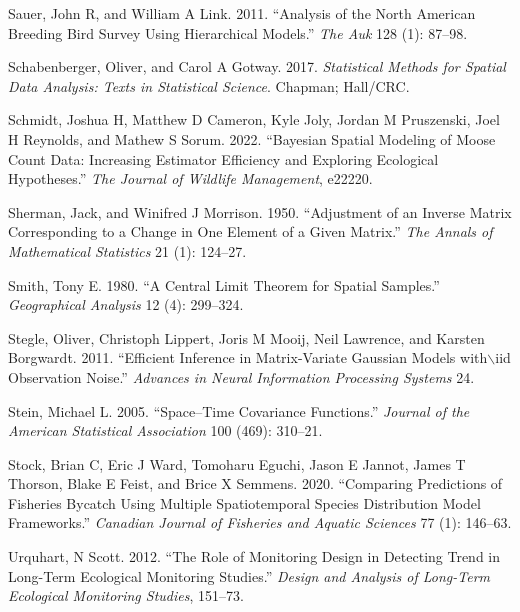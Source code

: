 \documentclass[smallextended]{svjour3}       %
\newlength{\cslhangindent}
\newlength{\cslentryspacingunit} %
\newenvironment{CSLReferences}[2] %
 {%
  \setlength{\parindent}{0pt}
  \ifodd #1
  \let\oldpar\par
  \def\par{\hangindent=\cslhangindent\oldpar}
  \fi
  \setlength{\parskip}{#2\cslentryspacingunit}
 }%
 {}
\begin{document}
\begin{CSLReferences}{1}{0}
\leavevmode{}%
Sauer, John R, and William A Link. 2011. {``Analysis of the North
American Breeding Bird Survey Using Hierarchical Models.''} \emph{The
Auk} 128 (1): 87--98.

\leavevmode{}%
Schabenberger, Oliver, and Carol A Gotway. 2017. \emph{Statistical
Methods for Spatial Data Analysis: Texts in Statistical Science}.
Chapman; Hall/CRC.

\leavevmode{}%
Schmidt, Joshua H, Matthew D Cameron, Kyle Joly, Jordan M Pruszenski,
Joel H Reynolds, and Mathew S Sorum. 2022. {``Bayesian Spatial Modeling
of Moose Count Data: Increasing Estimator Efficiency and Exploring
Ecological Hypotheses.''} \emph{The Journal of Wildlife Management},
e22220.

\leavevmode{}%
Sherman, Jack, and Winifred J Morrison. 1950. {``Adjustment of an
Inverse Matrix Corresponding to a Change in One Element of a Given
Matrix.''} \emph{The Annals of Mathematical Statistics} 21 (1): 124--27.

\leavevmode{}%
Smith, Tony E. 1980. {``A Central Limit Theorem for Spatial Samples.''}
\emph{Geographical Analysis} 12 (4): 299--324.

\leavevmode{}%
Stegle, Oliver, Christoph Lippert, Joris M Mooij, Neil Lawrence, and
Karsten Borgwardt. 2011. {``Efficient Inference in Matrix-Variate
Gaussian Models with\(\backslash\)iid Observation Noise.''}
\emph{Advances in Neural Information Processing Systems} 24.

\leavevmode{}%
Stein, Michael L. 2005. {``Space--Time Covariance Functions.''}
\emph{Journal of the American Statistical Association} 100 (469):
310--21.

\leavevmode{}%
Stock, Brian C, Eric J Ward, Tomoharu Eguchi, Jason E Jannot, James T
Thorson, Blake E Feist, and Brice X Semmens. 2020. {``Comparing
Predictions of Fisheries Bycatch Using Multiple Spatiotemporal Species
Distribution Model Frameworks.''} \emph{Canadian Journal of Fisheries
and Aquatic Sciences} 77 (1): 146--63.

\leavevmode{}%
Urquhart, N Scott. 2012. {``The Role of Monitoring Design in Detecting
Trend in Long-Term Ecological Monitoring Studies.''} \emph{Design and
Analysis of Long-Term Ecological Monitoring Studies}, 151--73.


\end{CSLReferences}
\end{document}
